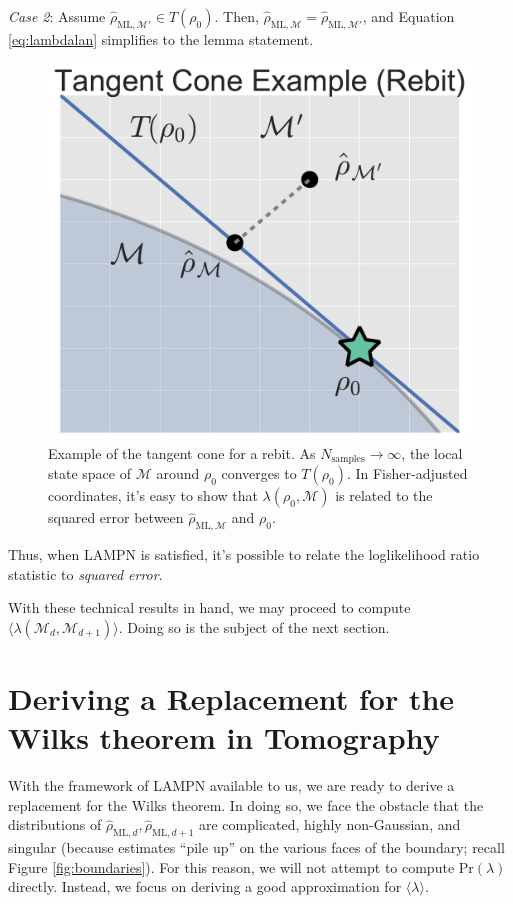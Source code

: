 \documentclass[aps,pra, twocolumn]{revtex4-1}
\newcommand{\M}{\mathcal{M}}
\newcommand{\rhohat}{\hat{\rho}}
\newcommand{\rhoML}[1]{\rhohat_{\scriptscriptstyle{\mathrm{ML},#1}}}
\begin{document}
\emph{Case 2}: Assume $\rhoML{\M'} \in T(\rho_{0})$. Then, $\rhoML{\M}= \rhoML{\M'}$, and Equation \eqref{eq:lambdalan} simplifies to the lemma statement.
\begin{figure}
\includegraphics[width=.75\columnwidth]{Images/Figure_temp.pdf}
 \caption{Example of the tangent cone for a rebit. As $N_{\mathrm{samples}} \rightarrow \infty$, the local state space of $\M$ around $\rho_{0}$ converges to $T(\rho_{0})$. In Fisher-adjusted coordinates, it's easy to show that $\lambda(\rho_{0}, \M)$ is related to the squared error between $\rhoML{\M}$ and $\rho_{0}$.}
\label{fig:tangentcone}
\end{figure}
Thus, when LAMPN is satisfied, it's possible to relate the loglikelihood ratio statistic to \emph{squared error}. 

With these technical results in hand, we may proceed to compute $\langle \lambda(\M_{d}, \M_{d+1})\rangle$. Doing so is the subject of the next section.

\section{Deriving a Replacement for the Wilks theorem in Tomography}
\label{sec:computingllrs}

With the framework of LAMPN available to us, we are ready to derive a replacement for the Wilks theorem. In doing so, we face the obstacle that the distributions of $\rhoML{d}, \rhoML{d+1}$ are complicated, highly non-Gaussian, and singular (because estimates ``pile up'' on the various faces of the boundary; recall Figure \ref{fig:boundaries}).  For this reason, we will not attempt to compute $\mathrm{Pr}(\lambda)$ directly.  Instead, we focus on deriving a good approximation for $\langle \lambda \rangle$.
\end{document}
